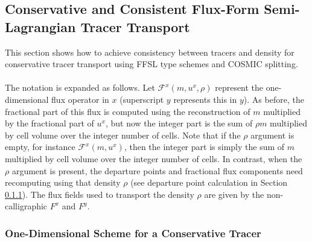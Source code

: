 \documentclass[11pt,a4paper]{article}
\begin{document}
\subsection{Conservative and Consistent Flux-Form Semi-Lagrangian Tracer Transport} \label{sec:consistent_ffsl}

This section shows how to achieve consistency between tracers and density for conservative tracer transport using FFSL type schemes and COSMIC splitting. \\
\\
The notation is expanded as follows. Let $\mathcal{F}^x(m,u^x,\rho)$ represent the one-dimensional flux operator in $x$ (superscript $y$ represents this in $y$). 
As before, the fractional part of this flux is computed using the reconstruction of $m$ multiplied by the fractional part of $u^x$, but now the integer part is the sum of $\rho m$ multiplied by cell volume over the integer number of cells.
Note that if the $\rho$ argument is empty, for instance $\mathcal{F}^x(m,u^x)$, then the integer part is simply the sum of $m$ multiplied by cell volume over the integer number of cells.
In contrast, when the $\rho$ argument is present, the departure points and fractional flux components need recomputing using that density $\rho$ (see departure point calculation in Section \ref{sec:1D_tracer}).
The flux fields used to transport the density $\rho$ are given by the non-calligraphic $F^x$ and $F^y$.

\subsubsection{One-Dimensional Scheme for a Conservative Tracer} \label{sec:1D_tracer}
\end{document}
